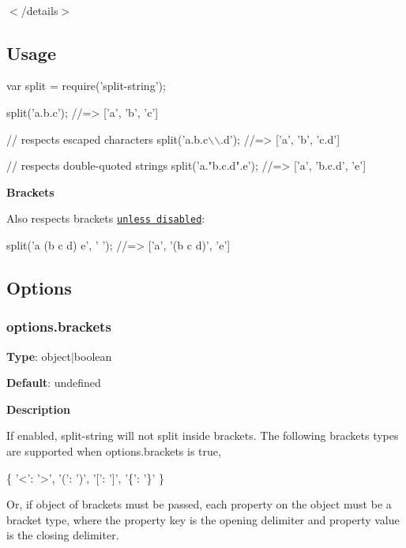 ~\newline


$<$/details$>$

\subsection*{Usage}


\begin{DoxyCode}
var split = require('split-string');

split('a.b.c');
//=> ['a', 'b', 'c']

// respects escaped characters
split('a.b.c\(\backslash\)\(\backslash\).d');
//=> ['a', 'b', 'c.d']

// respects double-quoted strings
split('a."b.c.d".e');
//=> ['a', 'b.c.d', 'e']
\end{DoxyCode}


{\bfseries Brackets}

Also respects brackets \href{#optionsbrackets}{\tt unless disabled}\+:


\begin{DoxyCode}
split('a (b c d) e', ' ');
//=> ['a', '(b c d)', 'e']
\end{DoxyCode}


\subsection*{Options}

\subsubsection*{options.\+brackets}

{\bfseries Type}\+: {\ttfamily object$\vert$boolean}

{\bfseries Default}\+: {\ttfamily undefined}

{\bfseries Description}

If enabled, split-\/string will not split inside brackets. The following brackets types are supported when {\ttfamily options.\+brackets} is {\ttfamily true},


\begin{DoxyCode}
\{
  '<': '>',
  '(': ')',
  '[': ']',
  '\{': '\}'
\}
\end{DoxyCode}


Or, if object of brackets must be passed, each property on the object must be a bracket type, where the property key is the opening delimiter and property value is the closing delimiter.

